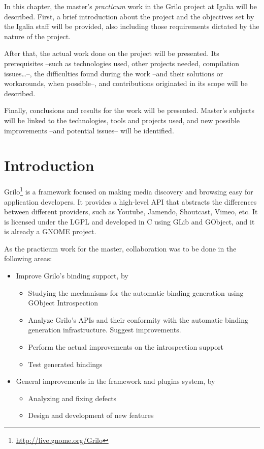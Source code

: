 In this chapter, the master's {\it practicum} work in the Grilo project at Igalia
will be described. First, a brief introduction about the project and the objectives set
by the Igalia staff will be provided, also including those requirements dictated
by the nature of the project.

After that, the actual work done on the project will be presented. Its
prerequisites --such as technologies used, other projects needed,
compilation issues\dots--, the difficulties found during the work --and their
solutions or workarounds, when possible--, and contributions originated in its scope
will be described.

Finally, conclusions and results for the work will be presented. Master's subjects
will be linked to the technologies, tools and projects used, and new possible improvements 
--and potential issues--  will be identified.

\section{Introduction}

Grilo\footnote{\url{http://live.gnome.org/Grilo}} is a framework focused on making media discovery and browsing easy for application developers. It provides
a high-level API that abstracts the differences between different providers, such as Youtube, Jamendo, Shoutcast,
Vimeo, etc. It is licensed under the LGPL and developed in C using GLib and GObject, and it is already a GNOME project.

As the practicum work for the master, collaboration was to be done in the following areas:
\begin{itemize}
\item Improve Grilo's binding support, by
\begin{itemize}
\item Studying the mechanisms for the automatic binding generation using GObject Introspection
\item Analyze Grilo's APIs and their conformity with the automatic binding generation infrastructure. Suggest improvements.
\item Perform the actual improvements on the introspection support
\item Test generated bindings
\end{itemize}
\item General improvements in the framework and plugins system, by
\begin{itemize}
\item Analyzing and fixing defects
\item Design and development of new features
\end{itemize}
\end{itemize}

